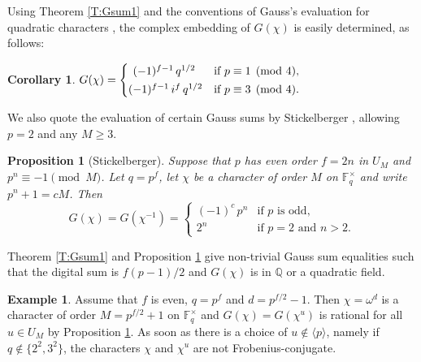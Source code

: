 \documentclass[12pt]{amsart}  \usepackage{amsmath,amssymb,enumerate,amscd,tikz,url}
\numberwithin{equation}{section}
\newtheorem{cor}[equation]{Corollary}
\newtheorem{prop}[equation]{Proposition}
\theoremstyle{definition}
\newtheorem{Ex}[equation]{Example}
\newcommand{\F}{{\mathbb F}}
\newcommand{\lr}[1]{{\langle {#1} \rangle}}
\begin{document}
\vspace{5 pt}

Using Theorem \ref{T:Gsum1} and the conventions of Gauss's evaluation for quadratic characters \cite[p.~362]{BEW}, the complex embedding of $G(\chi)$ is easily determined, as follows:

\begin{cor}
$
G(\chi) = \begin{cases}
\hspace{4 pt} (-1)^{f-1} \, q^{1/2} &\text{if }p\equiv 1 \pmod{4}, \vspace{2 pt} \\
(-1)^{f-1} \, i^{f} \,q^{1/2}  &\text{if }  p\equiv 3 \pmod{4}.
\end{cases}
$
\end{cor}

\vspace{5 pt}

We also quote the evaluation of certain Gauss sums by Stickelberger \cite[p.~364]{BEW},  allowing $p =2$ and any $M \ge 3$. 

\begin{prop}[Stickelberger] \label{StickelEval}
Suppose that $p$ has even order $f = 2n$ in $U_M$ and $p^n \equiv -1 \pmod{M}$.  Let $q=p^{f}$, let $\chi$ be a character of order $M$ on $\F_{q}^\times$ and write $p^n+1 = cM$.  Then
$$
G(\chi) = G(\chi^{-1}) = \begin{cases} (-1)^c \, p^n &\text{if } p \text{ is odd,} \\
                                                              2^n &\text{if } p = 2 \text{ and } n > 2.
                                        \end{cases}
$$ 
\end{prop}

Theorem \ref{T:Gsum1}  and Proposition \ref{StickelEval} give non-trivial Gauss sum equalities such that the digital sum is $f(p-1)/2$ and $G(\chi)$ is in $\mathbb{Q}$ or a quadratic field. 

\begin{Ex} \label{Ex400}
Assume that $f$ is even, $q = p^f$ and $d = p^{f/2}-1$.  Then $\chi = \omega^d$ is a character of order $M = p^{f/2}+1$ on $\F_q^\times$ and $G(\chi) = G(\chi^u)$ is rational for all $u \in U_M$ by Proposition \ref{StickelEval}.  As soon as there is a choice of $u \notin \lr{p}$, namely if $q  \notin \{2^2, 3^2\}$, the characters $\chi$ and $\chi^u$ are not Frobenius-conjugate.  
\end{Ex}
\end{document}
